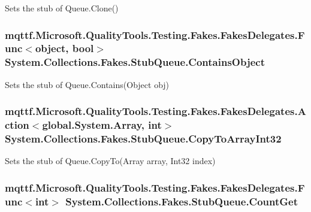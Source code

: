 Sets the stub of Queue.\-Clone()

\hypertarget{class_system_1_1_collections_1_1_fakes_1_1_stub_queue_ae37b8d6865c85fb22a8dca10d9ba8661}{
\subsubsection[{Contains\-Object}]{\setlength{\rightskip}{0pt plus 5cm}mqttf.\-Microsoft.\-Quality\-Tools.\-Testing.\-Fakes.\-Fakes\-Delegates.\-Func$<$object, bool$>$ System.\-Collections.\-Fakes.\-Stub\-Queue.\-Contains\-Object}}\label{class_system_1_1_collections_1_1_fakes_1_1_stub_queue_ae37b8d6865c85fb22a8dca10d9ba8661}


Sets the stub of Queue.\-Contains(\-Object obj)

\hypertarget{class_system_1_1_collections_1_1_fakes_1_1_stub_queue_ad8c9521f8338e20a620d8880b89fa07b}{
\subsubsection[{Copy\-To\-Array\-Int32}]{\setlength{\rightskip}{0pt plus 5cm}mqttf.\-Microsoft.\-Quality\-Tools.\-Testing.\-Fakes.\-Fakes\-Delegates.\-Action$<$global.\-System.\-Array, int$>$ System.\-Collections.\-Fakes.\-Stub\-Queue.\-Copy\-To\-Array\-Int32}}\label{class_system_1_1_collections_1_1_fakes_1_1_stub_queue_ad8c9521f8338e20a620d8880b89fa07b}


Sets the stub of Queue.\-Copy\-To(\-Array array, Int32 index)

\hypertarget{class_system_1_1_collections_1_1_fakes_1_1_stub_queue_a982b9d62a67117f1a73bf2a1ab9cb614}{
\subsubsection[{Count\-Get}]{\setlength{\rightskip}{0pt plus 5cm}mqttf.\-Microsoft.\-Quality\-Tools.\-Testing.\-Fakes.\-Fakes\-Delegates.\-Func$<$int$>$ System.\-Collections.\-Fakes.\-Stub\-Queue.\-Count\-Get}}\label{class_system_1_1_collections_1_1_fakes_1_1_stub_queue_a982b9d62a67117f1a73bf2a1ab9cb614}


